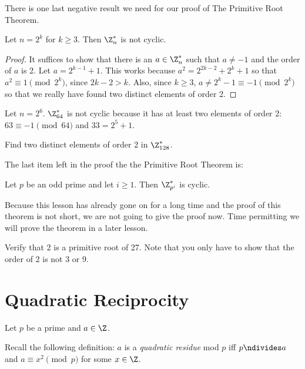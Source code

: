\documentclass[oneside,12pt]{amsart}
\begin{document}
There is one last negative result we need for our proof of The Primitive Root Theorem.

\begin{theorem}
Let $n=2^k$ for $k\geq 3$. Then $\Z^*_n$ is not cyclic.
\end{theorem}
\begin{proof}
It suffices to show that there is an $a\in\Z^*_n$ such that $a\not= -1$ and the order of $a$ is 2.
Let $a=2^{k-1} + 1$. This works because 
$a^2 = 2^{2k - 2} + 2^k + 1$ so that $a^2\equiv 1 \pmod {2^k}$, since $2k-2 > k$.
Also, since $k\geq 3$, $a \not= 2^k - 1 \equiv -1 \pmod {2^k}$ so that we really have found two
distinct elements of order 2.
\end{proof}

\begin{example}
Let $n=2^6$. $\Z^*_{64}$ is not cyclic because it has at least two elements of order 2: $63\equiv-1\pmod {64}$ and
$33 = 2^5+1$.
\end{example}

\begin{homework}
Find two distinct elements of order 2 in $\Z^*_{128}$.
\end{homework}

The last item left in the proof the the Primitive Root Theorem is:

\begin{theorem}
Let $p$ be an odd prime and let $i\geq 1$. Then $\Z^*_{p^i}$ is cyclic.
\end{theorem}

Because this lesson has already gone on for a long time and the proof of this theorem is not short, we are not going to give 
the proof now. Time permitting we will prove the theorem in a later lesson.

\begin{homework}
Verify that 2 is a primitive root of 27. Note that you only have to show that the order of 2 is not 3 or 9.
\end{homework}

\newpage

\section{Quadratic Reciprocity}
Let $p$ be a prime and $a\in\Z$.

\bigskip

Recall the following definition:  $a$ is a \emph{quadratic residue} mod $p$ iff $p\ndivides a$ and
$a\equiv x^2 \pmod p$ for some $x\in\Z$.
\end{document}
